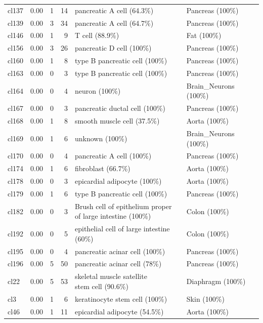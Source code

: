 \begin{table}[ht!]
\begin{tabular}{lrrrll}
  cl137 & 0.00 &   1 &  14 & pancreatic A cell (64.3\%) & Pancreas (100\%) \\ 
  cl139 & 0.00 &   3 &  34 & pancreatic A cell (64.7\%) & Pancreas (100\%) \\ 
  cl146 & 0.00 &   1 &   9 & T cell (88.9\%) & Fat (100\%) \\ 
  cl156 & 0.00 &   3 &  26 & pancreatic D cell (100\%) & Pancreas (100\%) \\ 
  cl160 & 0.00 &   1 &   8 & type B pancreatic cell (100\%) & Pancreas (100\%) \\ 
  cl163 & 0.00 &   0 &   3 & type B pancreatic cell (100\%) & Pancreas (100\%) \\ 
  cl164 & 0.00 &   0 &   4 & neuron (100\%) & Brain\_Neurons (100\%) \\ 
  cl167 & 0.00 &   0 &   3 & pancreatic ductal cell (100\%) & Pancreas (100\%) \\ 
  cl168 & 0.00 &   1 &   8 & smooth muscle cell (37.5\%) & Aorta (100\%) \\ 
  cl169 & 0.00 &   1 &   6 & unknown (100\%) & Brain\_Neurons (100\%) \\ 
  cl170 & 0.00 &   0 &   4 & pancreatic A cell (100\%) & Pancreas (100\%) \\ 
  cl174 & 0.00 &   1 &   6 & fibroblast (66.7\%) & Aorta (100\%) \\ 
  cl178 & 0.00 &   0 &   3 & epicardial adipocyte (100\%) & Aorta (100\%) \\
  cl179 & 0.00 &   1 &   6 & type B pancreatic cell (100\%) & Pancreas (100\%) \\ 
  cl182 & 0.00 &   0 &   3 & \specialcell[t]{Brush cell of epithelium proper\\of large intestine (100\%)} & Colon (100\%) \\ 
  cl192 & 0.00 &   0 &   5 & epithelial cell of large intestine (60\%) & Colon (100\%) \\ 
  cl195 & 0.00 &   0 &   4 & pancreatic acinar cell (100\%) & Pancreas (100\%) \\ 
  cl196 & 0.00 &   5 &  50 & pancreatic acinar cell (78\%) & Pancreas (100\%) \\ 
  cl22 & 0.00 &   5 &  53 & \specialcell[t]{skeletal muscle satellite\\stem cell (90.6\%)} & Diaphragm (100\%) \\ 
  cl3 & 0.00 &   1 &   6 & keratinocyte stem cell (100\%) & Skin (100\%) \\ 
  cl46 & 0.00 &   1 &  11 & epicardial adipocyte (54.5\%) & Aorta (100\%) \\ 

\end{tabular}
\end{table}
